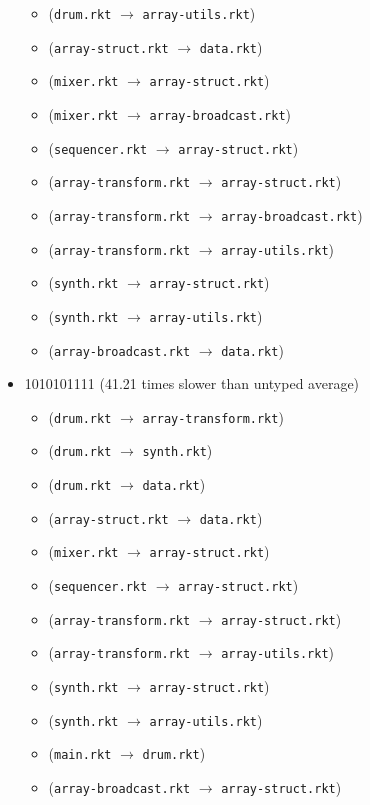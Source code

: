 \documentclass{article}
\newcommand{\mono}[1]{\texttt{#1}}
\begin{document}
\begin{itemize}
\begin{itemize}
  \item (\mono{drum.rkt} $\rightarrow$ \mono{array-utils.rkt})
  \item (\mono{array-struct.rkt} $\rightarrow$ \mono{data.rkt})
  \item (\mono{mixer.rkt} $\rightarrow$ \mono{array-struct.rkt})
  \item (\mono{mixer.rkt} $\rightarrow$ \mono{array-broadcast.rkt})
  \item (\mono{sequencer.rkt} $\rightarrow$ \mono{array-struct.rkt})
  \item (\mono{array-transform.rkt} $\rightarrow$ \mono{array-struct.rkt})
  \item (\mono{array-transform.rkt} $\rightarrow$ \mono{array-broadcast.rkt})
  \item (\mono{array-transform.rkt} $\rightarrow$ \mono{array-utils.rkt})
  \item (\mono{synth.rkt} $\rightarrow$ \mono{array-struct.rkt})
  \item (\mono{synth.rkt} $\rightarrow$ \mono{array-utils.rkt})
  \item (\mono{array-broadcast.rkt} $\rightarrow$ \mono{data.rkt})
  \end{itemize}
\item 1010101111 (41.21 times slower than untyped average)
  \begin{itemize}
  \item (\mono{drum.rkt} $\rightarrow$ \mono{array-transform.rkt})
  \item (\mono{drum.rkt} $\rightarrow$ \mono{synth.rkt})
  \item (\mono{drum.rkt} $\rightarrow$ \mono{data.rkt})
  \item (\mono{array-struct.rkt} $\rightarrow$ \mono{data.rkt})
  \item (\mono{mixer.rkt} $\rightarrow$ \mono{array-struct.rkt})
  \item (\mono{sequencer.rkt} $\rightarrow$ \mono{array-struct.rkt})
  \item (\mono{array-transform.rkt} $\rightarrow$ \mono{array-struct.rkt})
  \item (\mono{array-transform.rkt} $\rightarrow$ \mono{array-utils.rkt})
  \item (\mono{synth.rkt} $\rightarrow$ \mono{array-struct.rkt})
  \item (\mono{synth.rkt} $\rightarrow$ \mono{array-utils.rkt})
  \item (\mono{main.rkt} $\rightarrow$ \mono{drum.rkt})
  \item (\mono{array-broadcast.rkt} $\rightarrow$ \mono{array-struct.rkt})

\end{itemize}
\end{itemize}
\end{document}
